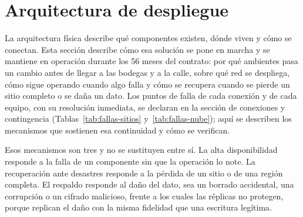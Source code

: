 %

\providecommand{\minititulo}[1]{\par\addvspace{8pt}\noindent{\intersemibold\color{lafroxTinta}#1}\par\nopagebreak\addvspace{2pt}}

\section{Arquitectura de despliegue}
\label{sec:despliegue}

La arquitectura física describe qué componentes existen, dónde viven y cómo se conectan. Esta sección describe cómo esa solución se pone en marcha y se mantiene en operación durante los 56 meses del contrato: por qué ambientes pasa un cambio antes de llegar a las bodegas y a la calle, sobre qué red se despliega, cómo sigue operando cuando algo falla y cómo se recupera cuando se pierde un sitio completo o se daña un dato. Los puntos de falla de cada conexión y de cada equipo, con su resolución inmediata, se declaran en la sección de conexiones y contingencia (Tablas~\ref{tab:fallas-sitios} y~\ref{tab:fallas-nube}); aquí se describen los mecanismos que sostienen esa continuidad y cómo se verifican.

Esos mecanismos son tres y no se sustituyen entre sí. La alta disponibilidad responde a la falla de un componente sin que la operación lo note. La recuperación ante desastres responde a la pérdida de un sitio o de una región completa. El respaldo responde al daño del dato, sea un borrado accidental, una corrupción o un cifrado malicioso, frente a los cuales las réplicas no protegen, porque replican el daño con la misma fidelidad que una escritura legítima.

